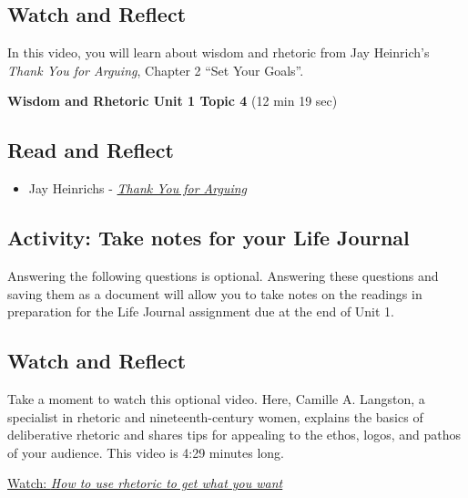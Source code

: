 \documentclass[
]{book}
\providecommand{\tightlist}{%
  \setlength{\itemsep}{0pt}\setlength{\parskip}{0pt}}
\begin{document}
\hypertarget{watch-and-reflect-5}{%
\subsection*{Watch and Reflect}\label{watch-and-reflect-5}}

In this video, you will learn about wisdom and rhetoric from Jay Heinrich's \emph{Thank You for Arguing}, Chapter 2 ``Set Your Goals''.

\textbf{Wisdom and Rhetoric Unit 1 Topic 4} (12 min 19 sec)

\hypertarget{read-and-reflect-3}{%
\subsection*{Read and Reflect}\label{read-and-reflect-3}}

\begin{itemize}
\tightlist
\item
  Jay Heinrichs - \href{assets/u1/PHIL-100-Heinrichs-Thank-You-for-Arguing.pdf}{\emph{Thank You for Arguing}}
\end{itemize}

\hypertarget{activity-take-notes-for-your-life-journal-1}{%
\subsection*{Activity: Take notes for your Life Journal}\label{activity-take-notes-for-your-life-journal-1}}

\begin{reflect}
Answering the following questions is optional. Answering these questions and saving them as a document will allow you to take notes on the readings in preparation for the Life Journal assignment due at the end of Unit 1.
\end{reflect}

\hypertarget{watch-and-reflect-6}{%
\subsection*{Watch and Reflect}\label{watch-and-reflect-6}}

\begin{reflect}
Take a moment to watch this optional video. Here, Camille A. Langston, a specialist in rhetoric and nineteenth-century women, explains the basics of deliberative rhetoric and shares tips for appealing to the ethos, logos, and pathos of your audience. This video is 4:29 minutes long.

\href{https://www.youtube.com/watch?v=3klMM9BkW5o}{Watch: \emph{How to use rhetoric to get what you want}}
\end{reflect}
\end{document}
